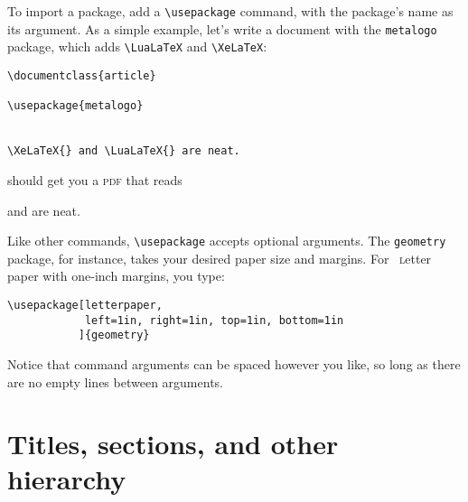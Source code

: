 To import a package, add a \verb|\usepackage| command,
with the package's name as its argument.
As a simple example, let's write a document with the \texttt{metalogo}
package, which adds \verb|\LuaLaTeX| and \verb|\XeLaTeX|:
\begin{leftfigure}
\begin{lstlisting}
\documentclass{article}

\usepackage{metalogo}


\XeLaTeX{} and \LuaLaTeX{} are neat.

\end{lstlisting}
\end{leftfigure}
\begin{samepage}
should get you a \textsc{pdf} that reads
\begin{leftfigure}
\lm \XeLaTeX{} and \LuaLaTeX{} are neat.
\end{leftfigure}
\end{samepage}
Like other commands, \verb|\usepackage| accepts optional arguments.
The \texttt{geometry} package, for instance,
takes your desired paper size and margins.
For ~\textsc{l}etter paper with one-inch margins,
you type:
\begin{leftfigure}
\begin{lstlisting}
\usepackage[letterpaper,
            left=1in, right=1in, top=1in, bottom=1in
           ]{geometry}
\end{lstlisting}
\end{leftfigure}
Notice
that command arguments can be spaced however you like,
so long as there are no empty lines between arguments.

\section{Titles, sections, and other hierarchy}

